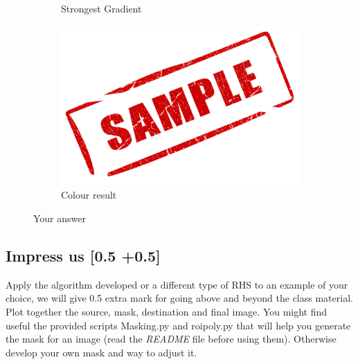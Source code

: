 \documentclass[paper=a4, fontsize=12pt]{scrartcl} %
\numberwithin{equation}{section}       %
\numberwithin{figure}{section}         %
\numberwithin{table}{section}          %
\begin{document}
\begin{figure}[H]
\begin{subfigure}[b]{0.80\textwidth}
        \caption{ Strongest Gradient}
    \end{subfigure}
        \begin{subfigure}[b]{0.80\textwidth}
        \includegraphics[width=\textwidth]{sample}
        \caption{ Colour result}
    \end{subfigure}
    \caption{Your answer}
    \label{fig:1}
\end{figure}



 \subsection{Impress us [0.5 +0.5]}
 Apply the algorithm developed or a different type of RHS to an example of your choice, we will give 0.5 extra mark for going above and beyond the class material.  Plot together the source, mask, destination and final image. 
 You might find useful the provided scripts Masking.py  and roipoly.py that will help you generate the mask for an image (read the \textit{README} file before using them). Otherwise develop your own mask and way to adjust it. 
\end{document}
